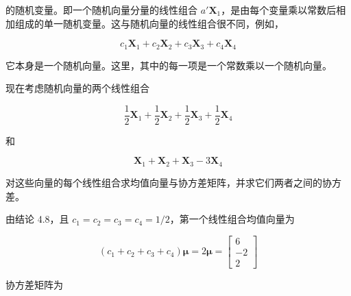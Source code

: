 的随机变量。即一个随机向量分量的线性组合 $a'\mathbf{X}_1$，是由每个变量乘以常数后相加组成的单一随机变量。这与随机向量的线性组合很不同，例如，

\[
c_1\mathbf{X}_1+c_2\mathbf{X}_2+c_3\mathbf{X}_3+c_4\mathbf{X}_4
\]

它本身是一个随机向量。这里，其中的每一项是一个常数乘以一个随机向量。

现在考虑随机向量的两个线性组合

\[
\frac{1}{2}\mathbf{X}_1+\frac{1}{2}\mathbf{X}_2+\frac{1}{2}\mathbf{X}_3+\frac{1}{2}\mathbf{X}_4
\]

和

\[
\mathbf{X}_1+\mathbf{X}_2+\mathbf{X}_3-3\mathbf{X}_4
\]

对这些向量的每个线性组合求均值向量与协方差矩阵，并求它们两者之间的协方差。

由结论 4.8，且 $c_1=c_2=c_3=c_4=1/2$，第一个线性组合均值向量为

\[
(c_1+c_2+c_3+c_4)\boldsymbol{\mu}=2\boldsymbol{\mu}=\begin{bmatrix}6\\-2\\2\end{bmatrix}
\]

协方差矩阵为
